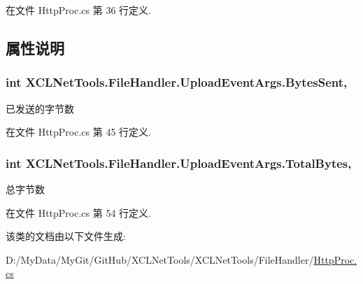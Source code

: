 在文件 Http\-Proc.\-cs 第 36 行定义.



\subsection{属性说明}
\hypertarget{class_x_c_l_net_tools_1_1_file_handler_1_1_upload_event_args_aeb753c87413d86d610121060635794e1}{
\subsubsection[{Bytes\-Sent}]{\setlength{\rightskip}{0pt plus 5cm}int X\-C\-L\-Net\-Tools.\-File\-Handler.\-Upload\-Event\-Args.\-Bytes\-Sent\hspace{0.3cm}{\ttfamily [get]}, {\ttfamily [set]}}}\label{class_x_c_l_net_tools_1_1_file_handler_1_1_upload_event_args_aeb753c87413d86d610121060635794e1}


已发送的字节数 



在文件 Http\-Proc.\-cs 第 45 行定义.

\hypertarget{class_x_c_l_net_tools_1_1_file_handler_1_1_upload_event_args_a874a8bc16016a3d11eb9aa52f9670eb4}{
\subsubsection[{Total\-Bytes}]{\setlength{\rightskip}{0pt plus 5cm}int X\-C\-L\-Net\-Tools.\-File\-Handler.\-Upload\-Event\-Args.\-Total\-Bytes\hspace{0.3cm}{\ttfamily [get]}, {\ttfamily [set]}}}\label{class_x_c_l_net_tools_1_1_file_handler_1_1_upload_event_args_a874a8bc16016a3d11eb9aa52f9670eb4}


总字节数 



在文件 Http\-Proc.\-cs 第 54 行定义.



该类的文档由以下文件生成\-:\begin{DoxyCompactItemize}
\item 
D\-:/\-My\-Data/\-My\-Git/\-Git\-Hub/\-X\-C\-L\-Net\-Tools/\-X\-C\-L\-Net\-Tools/\-File\-Handler/\hyperlink{_http_proc_8cs}{Http\-Proc.\-cs}\end{DoxyCompactItemize}
